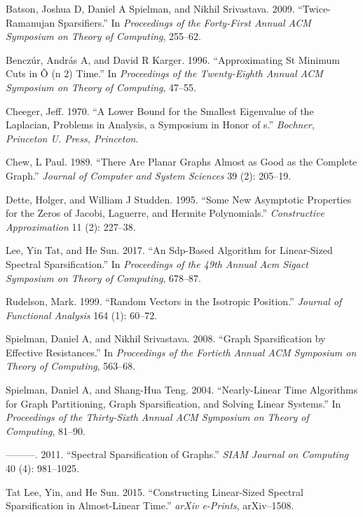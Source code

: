 \documentclass[
  letterpaper,
  DIV=11,
  numbers=noendperiod]{scrartcl}
\newlength{\cslhangindent}
\newlength{\cslentryspacingunit} %
\newenvironment{CSLReferences}[2] %
 {%
  \setlength{\parindent}{0pt}
  \ifodd #1
  \let\oldpar\par
  \def\par{\hangindent=\cslhangindent\oldpar}
  \fi
  \setlength{\parskip}{#2\cslentryspacingunit}
 }%
 {}
\theoremstyle{plain}
\theoremstyle{plain}
\theoremstyle{plain}
\theoremstyle{definition}
\theoremstyle{remark}
\begin{document}
\hypertarget{refs}{}
\begin{CSLReferences}{1}{0}
\leavevmode{}%
Batson, Joshua D, Daniel A Spielman, and Nikhil Srivastava. 2009.
{``Twice-Ramanujan Sparsifiers.''} In \emph{Proceedings of the
Forty-First Annual ACM Symposium on Theory of Computing}, 255--62.

\leavevmode{}%
Benczúr, András A, and David R Karger. 1996. {``Approximating St Minimum
Cuts in {Õ} (n 2) Time.''} In \emph{Proceedings of the Twenty-Eighth
Annual ACM Symposium on Theory of Computing}, 47--55.

\leavevmode{}%
Cheeger, Jeff. 1970. {``A Lower Bound for the Smallest Eigenvalue of the
Laplacian, Problems in Analysis, a Symposium in Honor of s.''}
\emph{Bochner, Princeton U. Press, Princeton}.

\leavevmode{}%
Chew, L Paul. 1989. {``There Are Planar Graphs Almost as Good as the
Complete Graph.''} \emph{Journal of Computer and System Sciences} 39
(2): 205--19.

\leavevmode{}%
Dette, Holger, and William J Studden. 1995. {``Some New Asymptotic
Properties for the Zeros of Jacobi, Laguerre, and Hermite
Polynomials.''} \emph{Constructive Approximation} 11 (2): 227--38.

\leavevmode{}%
Lee, Yin Tat, and He Sun. 2017. {``An Sdp-Based Algorithm for
Linear-Sized Spectral Sparsification.''} In \emph{Proceedings of the
49th Annual Acm Sigact Symposium on Theory of Computing}, 678--87.

\leavevmode{}%
Rudelson, Mark. 1999. {``Random Vectors in the Isotropic Position.''}
\emph{Journal of Functional Analysis} 164 (1): 60--72.

\leavevmode{}%
Spielman, Daniel A, and Nikhil Srivastava. 2008. {``Graph Sparsification
by Effective Resistances.''} In \emph{Proceedings of the Fortieth Annual
ACM Symposium on Theory of Computing}, 563--68.

\leavevmode{}%
Spielman, Daniel A, and Shang-Hua Teng. 2004. {``Nearly-Linear Time
Algorithms for Graph Partitioning, Graph Sparsification, and Solving
Linear Systems.''} In \emph{Proceedings of the Thirty-Sixth Annual ACM
Symposium on Theory of Computing}, 81--90.

\leavevmode{}%
---------. 2011. {``Spectral Sparsification of Graphs.''} \emph{SIAM
Journal on Computing} 40 (4): 981--1025.

\leavevmode{}%
Tat Lee, Yin, and He Sun. 2015. {``Constructing Linear-Sized Spectral
Sparsification in Almost-Linear Time.''} \emph{arXiv e-Prints},
arXiv--1508.

\end{CSLReferences}
\end{document}
